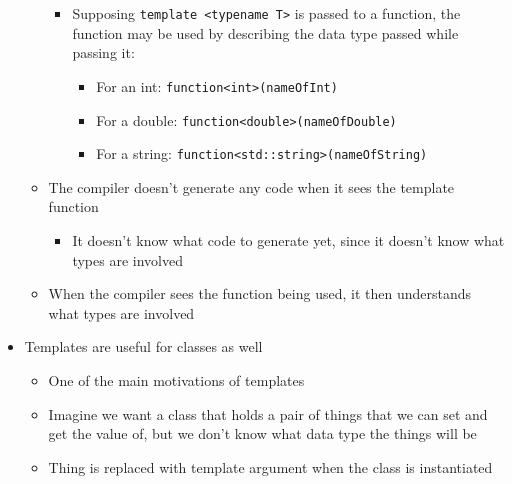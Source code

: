 \begin{itemize}
\begin{itemize}
\begin{itemize}
          \item Supposing \texttt{template <typename T>} is passed to a function, the function may be used by describing the data type passed while passing it:

            \begin{itemize}

              \item For an int: \texttt{function<int>(nameOfInt)}

              \item For a double: \texttt{function<double>(nameOfDouble)}

              \item For a string: \texttt{function<std::string>(nameOfString)}

            \end{itemize}

        \end{itemize}

      \item The compiler doesn't generate any code when it sees the template function

        \begin{itemize}

          \item It doesn't know what code to generate yet, since it doesn't know what types are involved

        \end{itemize}

      \item When the compiler sees the function being used, it then understands what types are involved

    \end{itemize}

  \item Templates are useful for classes as well

    \begin{itemize}

      \item One of the main motivations of templates

      \item Imagine we want a class that holds a pair of things that we can set and get the value of, but we don't know what data type the things will be

      \item Thing is replaced with template argument when the class is instantiated


\end{itemize}
\end{itemize}
